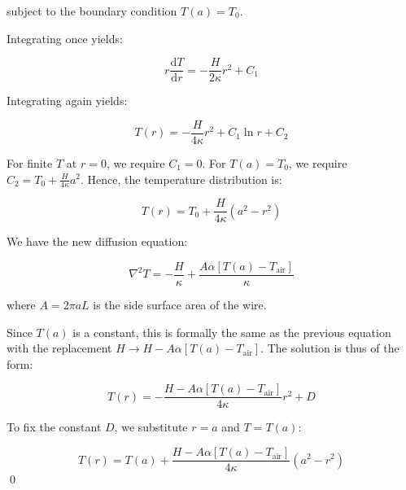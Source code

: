 \documentclass[12pt]{article}
\begin{document}
subject to the boundary condition $T(a) = T_{0}$.

Integrating once yields:

\begin{equation}
    r \frac{\mathrm{d}T}{\mathrm{d}r} = -\frac{H}{2\kappa} r^{2} + C_{1}
\end{equation}

Integrating again yields:

\begin{equation}
    T(r) = -\frac{H}{4\kappa} r^{2} + C_{1} \ln{r} + C_{2}
\end{equation}

For finite $T$ at $r = 0$, we require $C_{1} = 0$. For $T(a) = T_{0}$, we require $C_{2} = T_{0} + \frac{H}{4\kappa} a^{2}$. Hence, the temperature distribution is:

\begin{equation}
    T(r) = T_{0} + \frac{H}{4\kappa} \left( a^{2} - r^{2} \right)
\end{equation}


We have the new diffusion equation:

\begin{equation}
    \nabla^{2} T = -\frac{H}{\kappa} + \frac{A\alpha[T(a) - T_{\text{air}}]}{\kappa} 
\end{equation}

where $A = 2\pi a L$ is the side surface area of the wire.

Since $T(a)$ is a constant, this is formally the same as the previous equation with the replacement $H \rightarrow H - A\alpha[T(a) - T_{\text{air}}]$. The solution is thus of the form:

\begin{equation}
    T(r) = -\frac{H - A\alpha[T(a) - T_{\text{air}}]}{4\kappa} r^{2} + D
\end{equation}

To fix the constant $D$, we substitute $r = a$ and $T = T(a)$:

\begin{equation}
    T(r) = T(a) + \frac{H - A\alpha[T(a) - T_{\text{air}}]}{4\kappa} \left( a^{2} - r^{2} \right)
\end{equation}
\qed


\end{document}
